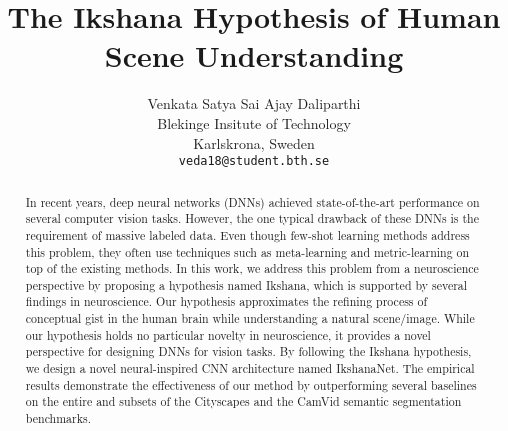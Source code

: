 \documentclass{article}
\title{The Ikshana Hypothesis of Human Scene Understanding}
\author{Venkata Satya Sai Ajay Daliparthi \\
  Blekinge Insitute of Technology\\
  Karlskrona, Sweden \\
  \texttt{veda18@student.bth.se} \\
}
\begin{document}
\maketitle

\begin{abstract}
In recent years, deep neural networks (DNNs) achieved state-of-the-art performance on several computer vision tasks. However, the one typical drawback of these DNNs is the requirement of massive labeled data. Even though few-shot learning methods address this problem, they often use techniques such as meta-learning and metric-learning on top of the existing methods. In this work, we address this problem from a neuroscience perspective by proposing a hypothesis named Ikshana, which is supported by several findings in neuroscience. Our hypothesis approximates the refining process of conceptual gist in the human brain while understanding a natural scene/image. While our hypothesis holds no particular novelty in neuroscience, it provides a novel perspective for designing DNNs for vision tasks. By following the Ikshana hypothesis, we design a novel neural-inspired CNN architecture named IkshanaNet.
The empirical results demonstrate the effectiveness of our method by outperforming several baselines on the entire and subsets of the Cityscapes and the CamVid semantic segmentation benchmarks.
\end{abstract}
\end{document}
